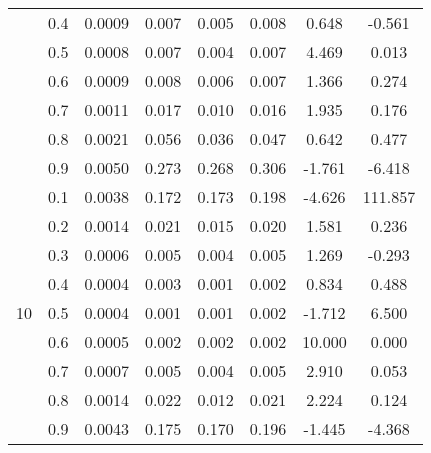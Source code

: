 \documentclass[11pt,a4paper]{report}
\begin{document}
\begin{longtable}{ | c | c || c | c | c | c | c | c | }
 & 0.4 & 0.0009 & 0.007 & 0.005 & 0.008 & 0.648 & -0.561 \\
 & 0.5 & 0.0008 & 0.007 & 0.004 & 0.007 & 4.469 & 0.013 \\
 & 0.6 & 0.0009 & 0.008 & 0.006 & 0.007 & 1.366 & 0.274 \\
 & 0.7 & 0.0011 & 0.017 & 0.010 & 0.016 & 1.935 & 0.176 \\
 & 0.8 & 0.0021 & 0.056 & 0.036 & 0.047 & 0.642 & 0.477 \\
 & 0.9 & 0.0050 & 0.273 & 0.268 & 0.306 & -1.761 & -6.418 \\
 \hline
\multirow{9}{*}{10} & 0.1 & 0.0038 & 0.172 & 0.173 & 0.198 & -4.626 & 111.857 \\
 & 0.2 & 0.0014 & 0.021 & 0.015 & 0.020 & 1.581 & 0.236 \\
 & 0.3 & 0.0006 & 0.005 & 0.004 & 0.005 & 1.269 & -0.293 \\
 & 0.4 & 0.0004 & 0.003 & 0.001 & 0.002 & 0.834 & 0.488 \\
 & 0.5 & 0.0004 & 0.001 & 0.001 & 0.002 & -1.712 & 6.500 \\
 & 0.6 & 0.0005 & 0.002 & 0.002 & 0.002 & 10.000 & 0.000 \\
 & 0.7 & 0.0007 & 0.005 & 0.004 & 0.005 & 2.910 & 0.053 \\
 & 0.8 & 0.0014 & 0.022 & 0.012 & 0.021 & 2.224 & 0.124 \\
 & 0.9 & 0.0043 & 0.175 & 0.170 & 0.196 & -1.445 & -4.368 \\
 \hline
\hline
\end{longtable}
\end{document}
